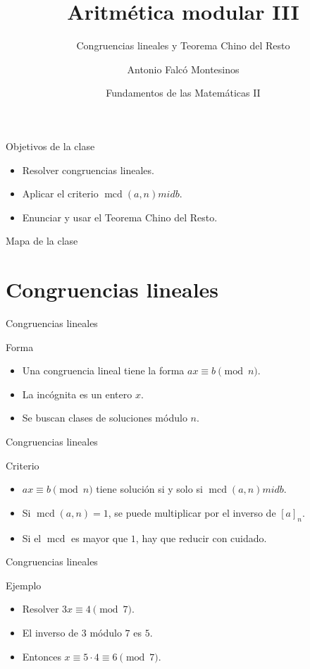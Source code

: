 \documentclass[aspectratio=169,11pt]{beamer}
\title[FdM II -- Clase 11]{Aritmética modular III}
\subtitle{Congruencias lineales y Teorema Chino del Resto}
\author{Antonio Falcó Montesinos}
\institute{Universidad CEU Cardenal Herrera}
\date{Fundamentos de las Matemáticas II}
\newcommand{\mcd}{\operatorname{mcd}}
\begin{document}
\begin{frame}
  \titlepage
\end{frame}

\begin{frame}{Objetivos de la clase}
\begin{itemize}
  \item Resolver congruencias lineales.
  \item Aplicar el criterio \(\mcd(a,n)mid b\).
  \item Enunciar y usar el Teorema Chino del Resto.
\end{itemize}
\end{frame}

\begin{frame}{Mapa de la clase}
\tableofcontents
\end{frame}

\section{Congruencias lineales}

\begin{frame}{Congruencias lineales}
\begin{block}{Forma}
\begin{itemize}
  \item Una congruencia lineal tiene la forma \(ax\equiv b\pmod n\).
  \item La incógnita es un entero \(x\).
  \item Se buscan clases de soluciones módulo \(n\).
\end{itemize}
\end{block}
\end{frame}

\begin{frame}{Congruencias lineales}
\begin{block}{Criterio}
\begin{itemize}
  \item \(ax\equiv b\pmod n\) tiene solución si y solo si \(\mcd(a,n)mid b\).
  \item Si \(\mcd(a,n)=1\), se puede multiplicar por el inverso de \([a]_n\).
  \item Si el \(\mcd\) es mayor que \(1\), hay que reducir con cuidado.
\end{itemize}
\end{block}
\end{frame}

\begin{frame}{Congruencias lineales}
\begin{block}{Ejemplo}
\begin{itemize}
  \item Resolver \(3x\equiv 4\pmod 7\).
  \item El inverso de \(3\) módulo \(7\) es \(5\).
  \item Entonces \(x\equiv 5\cdot 4\equiv 6\pmod 7\).
\end{itemize}
\end{block}
\end{frame}
\end{document}
